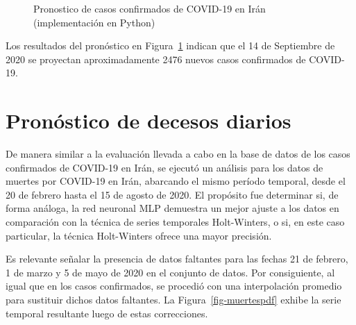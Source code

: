 \documentclass[
  us-letterpaper,
]{scrreprt}
\theoremstyle{definition}
\theoremstyle{plain}
\theoremstyle{plain}
\theoremstyle{definition}
\theoremstyle{remark}
\begin{document}
\begin{figure}


\caption{\label{fig-mlp1}Pronostico de casos confirmados de COVID-19 en
Irán (implementación en Python)}

\end{figure}%

Los resultados del pronóstico en Figura~\ref{fig-mlp1} indican que el 14
de Septiembre de 2020 se proyectan aproximadamente 2476 nuevos casos
confirmados de COVID-19.

\chapter{Pronóstico de decesos
diarios}\label{pronuxf3stico-de-decesos-diarios}

De manera similar a la evaluación llevada a cabo en la base de datos de
los casos confirmados de COVID-19 en Irán, se ejecutó un análisis para
los datos de muertes por COVID-19 en Irán, abarcando el mismo período
temporal, desde el 20 de febrero hasta el 15 de agosto de 2020. El
propósito fue determinar si, de forma análoga, la red neuronal MLP
demuestra un mejor ajuste a los datos en comparación con la técnica de
series temporales Holt-Winters, o si, en este caso particular, la
técnica Holt-Winters ofrece una mayor precisión.

Es relevante señalar la presencia de datos faltantes para las fechas 21
de febrero, 1 de marzo y 5 de mayo de 2020 en el conjunto de datos. Por
consiguiente, al igual que en los casos confirmados, se procedió con una
interpolación promedio para sustituir dichos datos faltantes. La
Figura~\ref{fig-muertespdf} exhibe la serie temporal resultante luego de
estas correcciones.
\end{document}
